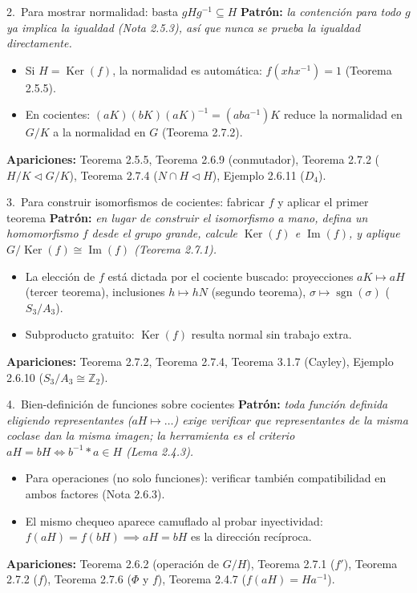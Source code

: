 \documentclass[11pt,twoside]{article}
\newcounter{result}[subsection]
\DeclareMathOperator{\Ker}{Ker}
\DeclareMathOperator{\Imm}{Im}
\DeclareMathOperator{\sgn}{sgn}
\newcommand{\Z}{\mathbb{Z}}
\begin{document}
\begin{strategybox}{2.\ Para mostrar normalidad: basta $gHg^{-1} \subseteq H$}
\textbf{Patrón:} \textit{la contención para todo $g$ ya implica la igualdad (Nota 2.5.3), así que nunca se prueba la igualdad directamente.}
\begin{itemize}[leftmargin=1.5em]
\item Si $H = \Ker(f)$, la normalidad es automática: $f(x h x^{-1}) = 1$ (Teorema 2.5.5).
\item En cocientes: $(aK)(bK)(aK)^{-1} = (aba^{-1})K$ reduce la normalidad en $G/K$ a la normalidad en $G$ (Teorema 2.7.2).
\end{itemize}
\textbf{Apariciones:} Teorema 2.5.5, Teorema 2.6.9 (conmutador), Teorema 2.7.2 ($H/K \triangleleft G/K$), Teorema 2.7.4 ($N \cap H \triangleleft H$), Ejemplo 2.6.11 ($D_4$).
\end{strategybox}

\begin{strategybox}{3.\ Para construir isomorfismos de cocientes: fabricar $f$ y aplicar el primer teorema}
\textbf{Patrón:} \textit{en lugar de construir el isomorfismo a mano, defina un homomorfismo $f$ desde el grupo grande, calcule $\Ker(f)$ e $\Imm(f)$, y aplique $G/\Ker(f) \cong \Imm(f)$ (Teorema 2.7.1).}
\begin{itemize}[leftmargin=1.5em]
\item La elección de $f$ está dictada por el cociente buscado: proyecciones $aK \mapsto aH$ (tercer teorema), inclusiones $h \mapsto hN$ (segundo teorema), $\sigma \mapsto \sgn(\sigma)$ ($S_3/A_3$).
\item Subproducto gratuito: $\Ker(f)$ resulta normal sin trabajo extra.
\end{itemize}
\textbf{Apariciones:} Teorema 2.7.2, Teorema 2.7.4, Teorema 3.1.7 (Cayley), Ejemplo 2.6.10 ($S_{3}/A_{3} \cong \Z_{2}$).
\end{strategybox}

\begin{strategybox}{4.\ Bien-definición de funciones sobre cocientes}
\textbf{Patrón:} \textit{toda función definida eligiendo representantes ($aH \mapsto \dots$) exige verificar que representantes de la misma coclase dan la misma imagen; la herramienta es el criterio $aH = bH \iff b^{-1} \ast a \in H$ (Lema 2.4.3).}
\begin{itemize}[leftmargin=1.5em]
\item Para operaciones (no solo funciones): verificar también compatibilidad en ambos factores (Nota 2.6.3).
\item El mismo chequeo aparece camuflado al probar inyectividad: $f(aH) = f(bH) \implies aH = bH$ es la dirección recíproca.
\end{itemize}
\textbf{Apariciones:} Teorema 2.6.2 (operación de $G/H$), Teorema 2.7.1 ($f'$), Teorema 2.7.2 ($f$), Teorema 2.7.6 ($\Phi$ y $f$), Teorema 2.4.7 ($f(aH) = Ha^{-1}$).
\end{strategybox}
\end{document}
